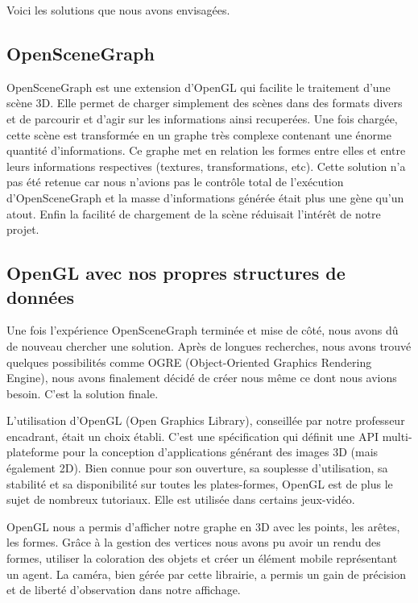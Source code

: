 \documentclass[a4paper,12pt]{report}
\begin{document}
Voici les solutions que nous avons envisagées.
 
\subsection{OpenSceneGraph}

OpenSceneGraph est une extension d'OpenGL qui facilite le traitement d'une scène 3D. Elle permet de charger simplement des scènes dans des formats divers et de parcourir et d'agir sur les informations ainsi recuperées.
Une fois chargée, cette scène est transformée en un graphe très complexe contenant une énorme quantité d'informations. Ce graphe met en relation les formes entre elles et entre leurs informations respectives (textures, transformations, etc).
Cette solution n'a pas été retenue car nous n'avions pas le contrôle total de l'exécution d'OpenSceneGraph et la masse d'informations générée était plus une gène qu'un atout. Enfin la facilité de chargement de la scène réduisait l'intérêt de notre projet.

\subsection{OpenGL avec nos propres structures de données}

Une fois l'expérience OpenSceneGraph terminée et mise de côté, nous avons dû de nouveau chercher une solution. Après de longues recherches, nous avons trouvé quelques possibilités comme OGRE (Object-Oriented Graphics Rendering Engine), nous avons finalement décidé de créer nous même ce dont nous avions besoin. C'est la solution finale.

L'utilisation d'OpenGL (Open Graphics Library), conseillée par notre professeur encadrant, était un choix établi. C'est une spécification qui définit une API multi-plateforme pour la conception d'applications générant des images 3D (mais également 2D). Bien connue pour son ouverture, sa souplesse d'utilisation, sa stabilité et sa disponibilité sur toutes les plates-formes, OpenGL est de plus le sujet de nombreux tutoriaux. Elle est utilisée dans certains jeux-vidéo.

OpenGL nous a permis d'afficher notre graphe en 3D avec les points, les arêtes, les formes. Grâce à la gestion des vertices nous avons pu avoir un rendu des formes, utiliser la coloration des objets et créer un élément mobile représentant un agent. La caméra, bien gérée par cette librairie, a permis un gain de précision et de liberté d'observation dans notre affichage.
\end{document}

